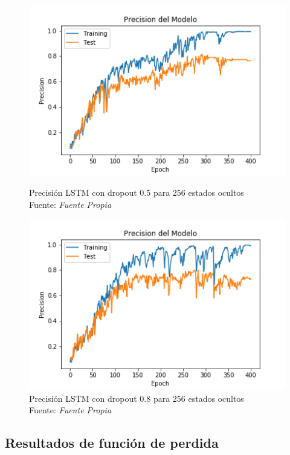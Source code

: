 \begin{figure}[H]
	\centering
	\includegraphics[width=0.7\linewidth]{Figures/lstm5_256_13prec}
	\caption{Precisión LSTM con dropout 0.5 para 256 estados ocultos\\ Fuente: {\textit{Fuente Propia}}}
	\label{fig:lstm525613prec}
	\centering
	\includegraphics[width=0.7\linewidth]{Figures/lst_256_13prec}
	\caption{Precisión LSTM con dropout 0.8 para 256 estados ocultos\\ Fuente: {\textit{Fuente Propia}}}
	\label{fig:lst25613prec}
\end{figure}
\newpage

\subsection{Resultados de función de perdida}

